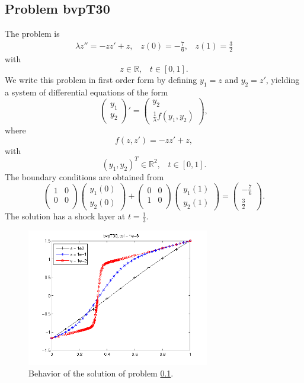 \documentclass[<options>]{article}
\def \RR {{\mathbb{R}}}
\begin{document}
\subsection{Problem bvpT30}\label{test30}
The problem is
\begin{eqnarray*}
\lambda z'' = - z z' +  z , \;\;\;z(0) =-\frac{7}{6}, \;\;\; z(1) = \frac{3}{2}
\end{eqnarray*}
with
\[
z \in \RR, \;\;\; t\in [0,1].
\]
We write this problem in first order form by defining $y_1=z$ and $y_2=z'$, yielding a system of differential equations of the form
\begin{equation*}
\left(\begin{array}{c}
y_1\\
y_2
\end{array}\right)'=
\left(\begin{array}{c}
y_2\\
\frac{1}{\lambda}f(y_1,y_2)
\end{array}\right),
\end{equation*}
where
\begin{equation*}
f(z,z') = - z z' +  z,
\end{equation*}
with
\[
(y_1,y_2)^T \in \RR^{2}, \;\;\;  t \in [0,1].
\]
The  boundary conditions are obtained from
\begin{equation*}
\left(
  \begin{array}{cc}
    1 & 0 \\
    0 & 0 \\
  \end{array}
\right)
\left(\begin{array}{c}
y_{1}(0)\\
y_{2}(0)
\end{array}\right)
+
\left(
  \begin{array}{cc}
    0 & 0 \\
    1 & 0 \\
  \end{array}
\right)
\left(\begin{array}{c}
y_{1}(1)\\
y_{2}(1)
\end{array}\right)=\left(\begin{array}{c}
-\frac{7}{6} \\
\frac{3}{2}
\end{array}\right).
\end{equation*}
The solution has a shock layer  at $t= \frac{1}{3}.$

\begin{figure}[htb]
\centerline{\includegraphics[height=6cm]{Prob30}}
\caption{Behavior of the solution of problem \ref{test30}.}
\end{figure}
\newpage
\end{document}
